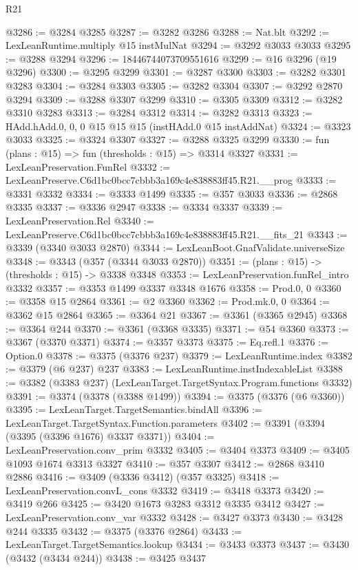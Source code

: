 \begin{lexlean}{R21}
\begin{coremodule}
{{{{{{{{{{{{{{{{{{{@3286 := @3284 @3285
@3287 := @3282 @3286
@3288 := Nat.blt
@3292 := LexLeanRuntime.multiply @15 instMulNat
@3294 := @3292 @3033 @3033
@3295 := @3288 @3294
@3296 := 18446744073709551616
@3299 := @16 @3296 (@19 @3296)
@3300 := @3295 @3299
@3301 := @3287 @3300
@3303 := @3282 @3301 @3283
@3304 := @3284 @3303
@3305 := @3282 @3304
@3307 := @3292 @2870 @3294
@3309 := @3288 @3307 @3299
@3310 := @3305 @3309
@3312 := @3282 @3310 @3283
@3313 := @3284 @3312
@3314 := @3282 @3313
@3323 := HAdd.hAdd.{0, 0, 0} @15 @15 @15 (instHAdd.{0} @15 instAddNat)
@3324 := @3323 @3033
@3325 := @3324 @3307
@3327 := @3288 @3325 @3299
@3330 := fun (plans : @15) => fun (thresholds : @15) => @3314 @3327
@3331 := LexLeanPreservation.FunRel
@3332 := LexLeanPreserve.C6d1bc0bcc7cbbb3a169c4e838883ff45.R21.__prog
@3333 := @3331 @3332
@3334 := @3333 @1499
@3335 := @357 @3033
@3336 := @2868 @3335
@3337 := @3336 @2947
@3338 := @3334 @3337
@3339 := LexLeanPreservation.Rel
@3340 := LexLeanPreserve.C6d1bc0bcc7cbbb3a169c4e838883ff45.R21.__fits_21
@3343 := @3339 (@3340 @3033 @2870)
@3344 := LexLeanBoot.GnafValidate.universeSize
@3348 := @3343 (@357 (@3344 @3033 @2870))
@3351 := (plans : @15) -> (thresholds : @15) -> @3338 @3348
@3353 := LexLeanPreservation.funRel_intro @3332
@3357 := @3353 @1499 @3337 @3348 @1676
@3358 := Prod.{0, 0}
@3360 := @3358 @15 @2864
@3361 := @2 @3360
@3362 := Prod.mk.{0, 0}
@3364 := @3362 @15 @2864
@3365 := @3364 @21
@3367 := @3361 (@3365 @2945)
@3368 := @3364 @244
@3370 := @3361 (@3368 @3335)
@3371 := @54 @3360
@3373 := @3367 (@3370 @3371)
@3374 := @3357 @3373
@3375 := Eq.refl.{1}
@3376 := Option.{0}
@3378 := @3375 (@3376 @237)
@3379 := LexLeanRuntime.index
@3382 := @3379 (@6 @237) @237
@3383 := LexLeanRuntime.instIndexableList
@3388 := @3382 (@3383 @237) (LexLeanTarget.TargetSyntax.Program.functions @3332)
@3391 := @3374 (@3378 (@3388 @1499))
@3394 := @3375 (@3376 (@6 @3360))
@3395 := LexLeanTarget.TargetSemantics.bindAll
@3396 := LexLeanTarget.TargetSyntax.Function.parameters
@3402 := @3391 (@3394 (@3395 (@3396 @1676) @3337 @3371))
@3404 := LexLeanPreservation.conv_prim @3332
@3405 := @3404 @3373
@3409 := @3405 @1093 @1674 @3313 @3327
@3410 := @357 @3307
@3412 := @2868 @3410 @2886
@3416 := @3409 (@3336 @3412) (@357 @3325)
@3418 := LexLeanPreservation.convL_cons @3332
@3419 := @3418 @3373
@3420 := @3419 @266
@3425 := @3420 @1673 @3283 @3312 @3335 @3412
@3427 := LexLeanPreservation.conv_var @3332
@3428 := @3427 @3373
@3430 := @3428 @244 @3335
@3432 := @3375 (@3376 @2864)
@3433 := LexLeanTarget.TargetSemantics.lookup
@3434 := @3433 @3373
@3437 := @3430 (@3432 (@3434 @244))
@3438 := @3425 @3437
}}}}}}}}}}}}}}}}}}}
\end{coremodule}
\end{lexlean}
